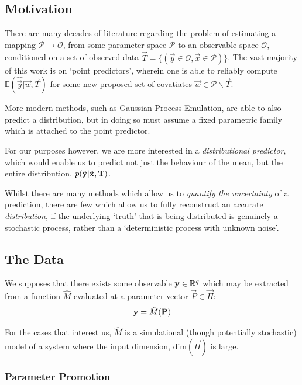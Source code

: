 
\subsection{Motivation}

	There are many decades of literature regarding the problem of estimating a mapping $\mathcal{P}\to\mathcal{O}$, from some parameter space $\mathcal{P}$ to an observable space $\mathcal{O}$, conditioned on a set of observed data $\vec{T} = \{(\vec{y} \in \mathcal{O}, \vec{x}\in \mathcal{P})\}$. The vast majority of this work is on `point predictors', wherein one is able to reliably compute $\mathbb{E}(\hat{\vec{y}} | \vec{w}, \vec{T})$ for some new proposed set of covatiates $\vec{w}\in \mathcal{P} \backslash{} \vec{T}$.

	More modern methods, such as Gaussian Process Emulation, are able to also predict a distribution, but in doing so must assume a fixed parametric family which is attached to the point predictor.

	For our purposes however, we are more interested in a \textit{distributional predictor}, which would enable us to predict not just the behaviour of the mean, but the entire distribution, $p(\hat{\mathbf{\boldsymbol{\mathrm{y}}}}| \hat{\mathbf{\boldsymbol{\mathrm{x}}}}, \mathbf{\boldsymbol{\mathrm{T}}})$.

	Whilst there are many methods which allow us to \textit{quantify the uncertainty} of a prediction, there are few which allow us to fully reconstruct an accurate \textit{distribution}, if the underlying `truth' that is being distributed is genuinely a stochastic process, rather than a `deterministic process with unknown noise'.


\subsection{The Data}

	We supposes that there exists some observable $\mathbf{\boldsymbol{\mathrm{y}}} \in \mathbb{R}^q$ which may be extracted from a function $\hat{M}$ evaluated at a parameter vector $\vec{P} \in \vec{\Pi}$:
	\begin{equation}
		\mathbf{\boldsymbol{\mathrm{y}}} = \hat{M}(\mathbf{\boldsymbol{\mathrm{P}}})
	\end{equation}


	For the cases that interest us, $\hat{M}$ is a simulational (though potentially stochastic) model of a system where the input dimension, $\text{dim}(\vec{\Pi})$ is large.

	\subsubsection{Parameter Promotion}

